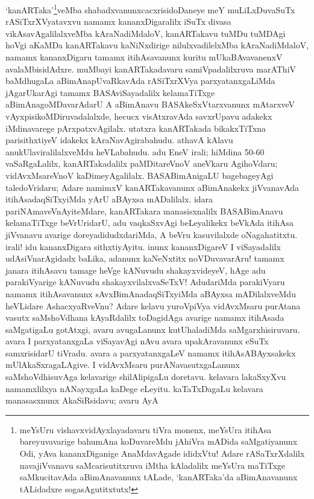 \documentclass[11pt,a4size]{article}
\begin{document}
`kanARTaka'\footnote[1]{meYsUru vishavxvidAyxlayadavaru tiVra monenx,
  meYsUra itihAsa bareyuvavarige bahumAna koDuvareMdu jAhiVra mADida
  saMgatiyanunx Odi, yAva kananxDiganige AnaMdavAgade ididxVtu! Adare
  rASaTxrXdalilx navajiVvanavu saMcarisutitxruva iMtha kAladalilx
  meYsUra maTiTxge saMkucitavAda aBimAnavanunx tALade, `kanARTaka'da
  aBimAnavanunx tALidadxre sogasAgutitxtutx!}veMba
  shabadxvanunxcacxrisidoDaneye meY muLiLxDuvaSuTx rASiTxrXVyatavxvu
  namamx kananxDigaralilx iSuTx divasa vikAsavAgalilalxveMba
  kAraNadiMdaloV, kanARTakavu tuMDu tuMDAgi hoVgi aKaMDa kanARTakavu
  kaNiNxdirige nilulxvadilelxMba kAraNadiMdaloV, namamx kananxDigaru
  tamamx itihAsavanunx kuritu mUkaBAvavanenxV
  avalaMbisidAdxre. muMbayi kanARTakadavaru samiVpadalilxruva marAThiV
  baMdhugaLa aBimAnapUvaRkavAda rASiTxrXVya parxyatanxgaLiMda
  jAgarUkarAgi tamamx BASAviSayadalilx kelamaTiTxge
  aBimAnagoMDavarAdarU A aBimAnavu BASAkeSxVtarxvanunx mAtarxveV
  vAyxpisikoMDiruvadalalxde, hecucx visAtxravAda savxrUpavu adakekx
  iMdinavarege pArxpatxvAgilalx. utatxra kanARTakada bikakxTiTxna
  parisithxtiyeV idakekx kAraNavAgirabahudu. athavA kAlavu
  anukUlaviralilalxveMdu heVLabahudu. adu EneV irali; hiMdina 50-60
  vaSaRgaLalilx, kanARTakadalilx paMDitareVnoV aneVkaru AgihoVdaru;
  vidAvxMsareVnoV kaDimeyAgalilalx. BASABimAnigaLU bagebageyAgi
  taledoVridaru; Adare namimxV kanARTakavanunx aBimAnakekx jiVvanavAda
  itihAsadaqSiTxyiMda yArU aBAyxsa mADalilalx. idara
  pariNAmaveVnAyiteMdare, kanARTakara manasisxnalilx BASABimAnavu
  kelamaTiTxge beVrUridarU, adu vaqkaSxvAgi beLeyalikekx beVkAda
  itihAsa jiVvanavu avarige doreyadidudxdariMda, A beVru kasuvilalxde
  oNagahatitxtu. irali! idu kananxDigara sithxtiyAyitu. inunx
  kananxDigareV I viSayadalilx udAsiVnarAgidadx baLika, adanunx
  kaNeNxtitx noVDuvavarAru! tamamx janara itihAsavu tamage heVge
  kANuvudu shakayxvideyeV, hAge adu parakiVyarige kANuvudu
  shakayxvilalxvaSeTxV! AdudariMda parakiVyaru namamx itihAsavanunx
  sAvxBimAnadaqSiTxyiMda aBAyxsa mADilalxveMdu heVLidare
  AshacxyaRveVnu? Adare kelavu yuroVpiVya vidAvxMsaru purAtana vasutx
  saMshoVdhana kAyaRdalilx toDagidAga avarige namamx itihAsada
  saMgatigaLu gotAtxgi, avaru avugaLanunx kutUhaladiMda
  saMgarxhisiruvaru. avara I parxyatanxgaLa viSayavAgi nAvu avara
  upakAravanunx eSuTx samxrisidarU tiVradu. avara a parxyatanxgaLeV
  namamx itihAsABAyxsakekx mUlAkaSxragaLAgive. I vidAvxMsaru
  purANavasutxgaLanunx saMshoVdhisuvAga kelavarige shilAlipigaLu
  doretavu. kelavara lakaSxyXvu namamxlilxya nANayxgaLa kaDege
  eLeyitu. kaTaTxDagaLu kelavara manasasxnunx AkaSiRsidavu; avaru AyA
\end{document}
